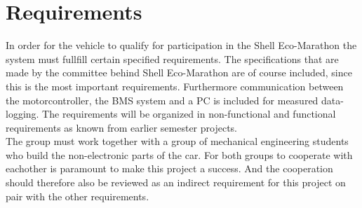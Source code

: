 \chapter{Requirements}
\label{sec:requirements}
In order for the vehicle to qualify for participation in the Shell Eco-Marathon the system must fullfill certain specified requirements. The specifications that are made by the committee behind Shell Eco-Marathon are of course included, since this is the most important requirements. Furthermore communication between the motorcontroller, the BMS system and a PC is included for measured data-logging. The requirements will be organized in non-functional and functional requirements as known from earlier semester projects. \\
The group must work together with a group of mechanical engineering students who build the non-electronic parts of the car. For both groups to cooperate with eachother is paramount to make this project a success. And the cooperation should therefore also be reviewed as an indirect requirement for this project on pair with the other requirements.\\


\pagebreak

\pagebreak